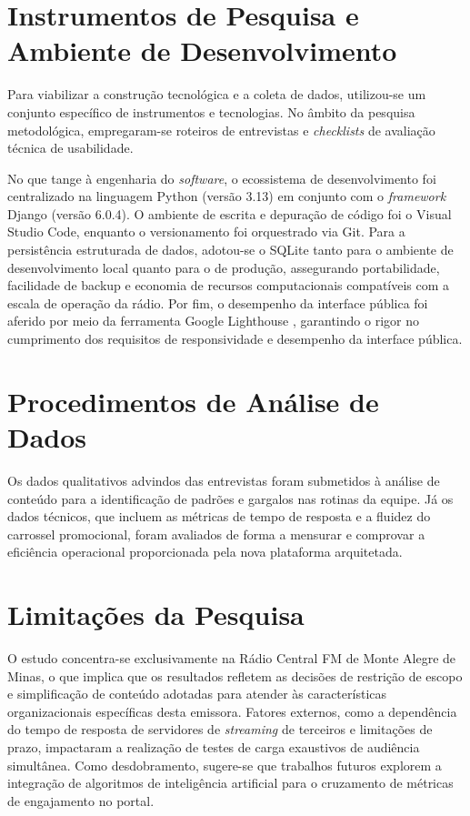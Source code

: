 \documentclass[12pt, openright, oneside, a4paper, brazil]{ads-unipac-abntex2}
\begin{document}
\section{Instrumentos de Pesquisa e Ambiente de Desenvolvimento}
Para viabilizar a construção tecnológica e a coleta de dados, utilizou-se um conjunto específico de instrumentos e tecnologias. No âmbito da pesquisa metodológica, empregaram-se roteiros de entrevistas e \textit{checklists} de avaliação técnica de usabilidade.

No que tange à engenharia do \textit{software}, o ecossistema de desenvolvimento foi centralizado na linguagem Python (versão 3.13) em conjunto com o \textit{framework} Django (versão 6.0.4). O ambiente de escrita e depuração de código foi o Visual Studio Code, enquanto o versionamento foi orquestrado via Git. Para a persistência estruturada de dados, adotou-se o SQLite tanto para o ambiente de desenvolvimento local quanto para o de produção, assegurando portabilidade, facilidade de backup e economia de recursos computacionais compatíveis com a escala de operação da rádio. Por fim, o desempenho da interface pública foi aferido por meio da ferramenta Google Lighthouse \cite{google2026}, garantindo o rigor no cumprimento dos requisitos de responsividade e desempenho da interface pública.

\textual
\section{Procedimentos de Análise de Dados}
Os dados qualitativos advindos das entrevistas foram submetidos à análise de conteúdo para a identificação de padrões e gargalos nas rotinas da equipe. Já os dados técnicos, que incluem as métricas de tempo de resposta e a fluidez do carrossel promocional, foram avaliados de forma a mensurar e comprovar a eficiência operacional proporcionada pela nova plataforma arquitetada.

\section{Limitações da Pesquisa}
O estudo concentra-se exclusivamente na Rádio Central FM de Monte Alegre de Minas, o que implica que os resultados refletem as decisões de restrição de escopo e simplificação de conteúdo adotadas para atender às características organizacionais específicas desta emissora. Fatores externos, como a dependência do tempo de resposta de servidores de \textit{streaming} de terceiros e limitações de prazo, impactaram a realização de testes de carga exaustivos de audiência simultânea. Como desdobramento, sugere-se que trabalhos futuros explorem a integração de algoritmos de inteligência artificial para o cruzamento de métricas de engajamento no portal.
\end{document}
